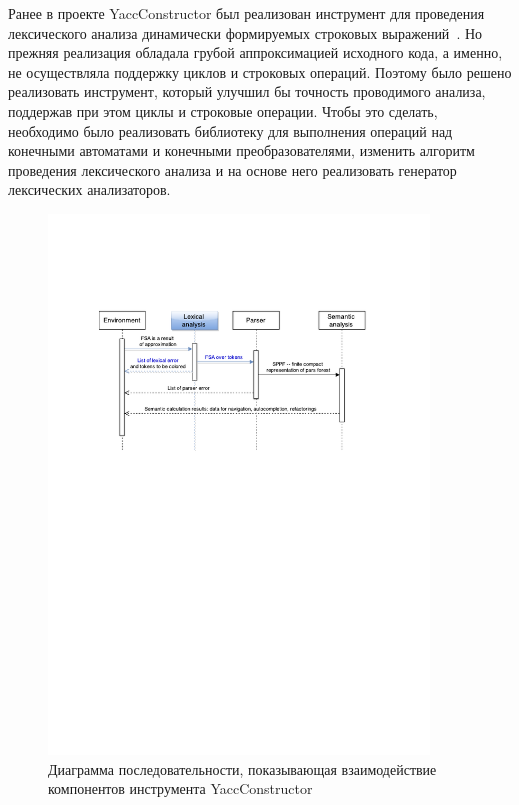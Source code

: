 \documentclass{matmex-diploma}
\begin{document}
Ранее в проекте YaccConstructor был реализован инструмент для проведения лексического анализа динамически формируемых строковых выражений~\cite{Verbitskaya, Polubelova}. Но прежняя реализация обладала грубой аппроксимацией исходного кода, а именно, не осуществляла поддержку циклов и строковых операций. Поэтому было решено реализовать инструмент, который улучшил  бы точность проводимого анализа, поддержав при этом циклы и строковые операции. Чтобы это сделать, необходимо было реализовать библиотеку для выполнения операций над конечными автоматами и конечными преобразователями, изменить алгоритм проведения лексического анализа и на основе него реализовать генератор лексических анализаторов. 

\begin{figure}[h!]
\begin{center}
\includegraphics[width=0.9\textwidth]{Seq_with_lexer_highlighted}
\caption{Диаграмма последовательности, показывающая взаимодействие компонентов инструмента YaccConstructor}
\label{fig:seqYC} 
\end{center}
\end{figure}
\end{document}
